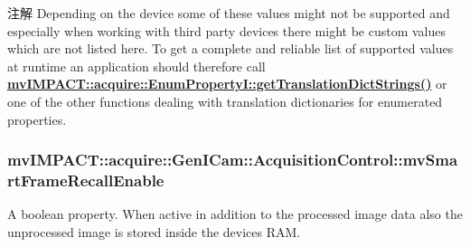 \begin{DoxyNote}{注解}
Depending on the device some of these values might not be supported and especially when working with third party devices there might be custom values which are not listed here. To get a complete and reliable list of supported values at runtime an application should therefore call {\bfseries \hyperlink{classmv_i_m_p_a_c_t_1_1acquire_1_1_enum_property_i_a0ba6ccbf5ee69784d5d0b537924d26b6}{mv\+I\+M\+P\+A\+C\+T\+::acquire\+::\+Enum\+Property\+I\+::get\+Translation\+Dict\+Strings()}} or one of the other functions dealing with translation dictionaries for enumerated properties. 
\end{DoxyNote}
\hypertarget{classmv_i_m_p_a_c_t_1_1acquire_1_1_gen_i_cam_1_1_acquisition_control_aeb86056e3eb76d5c80c4048ac9ba10d5}{
\subsubsection[{mv\+Smart\+Frame\+Recall\+Enable}]{ mv\+I\+M\+P\+A\+C\+T\+::acquire\+::\+Gen\+I\+Cam\+::\+Acquisition\+Control\+::mv\+Smart\+Frame\+Recall\+Enable}}\label{classmv_i_m_p_a_c_t_1_1acquire_1_1_gen_i_cam_1_1_acquisition_control_aeb86056e3eb76d5c80c4048ac9ba10d5}


A boolean property. When active in addition to the processed image data also the unprocessed image is stored inside the devices R\+A\+M. 


